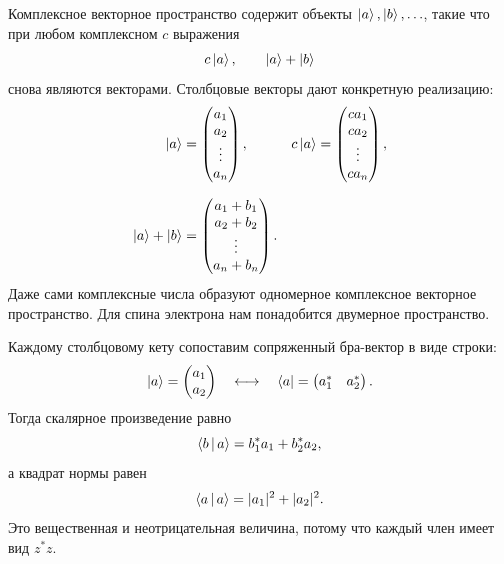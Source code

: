Комплексное векторное пространство содержит объекты \(\left\lvert a\right\rangle,\left\lvert b\right\rangle,\ldots\), такие что при любом комплексном \(c\) выражения
\begin{equation}
  c\left\lvert a\right\rangle,
  \qquad
  \left\lvert a\right\rangle+\left\lvert b\right\rangle
\end{equation}
снова являются векторами. Столбцовые векторы дают конкретную реализацию:
\begin{equation}
  \begin{aligned}
    \left\lvert a\right\rangle&=
    \begin{pmatrix}
      a_1\\a_2\\ \vdots\\a_n
    \end{pmatrix},
    &
    c\left\lvert a\right\rangle&=
    \begin{pmatrix}
      ca_1\\ca_2\\ \vdots\\ca_n
    \end{pmatrix},\\[0.7em]
    \left\lvert a\right\rangle+\left\lvert b\right\rangle&=
    \begin{pmatrix}
      a_1+b_1\\a_2+b_2\\ \vdots\\a_n+b_n
    \end{pmatrix}.
  \end{aligned}
  \label{eq:l02-vector-operations}
\end{equation}
Даже сами комплексные числа образуют одномерное комплексное векторное пространство. Для спина электрона нам понадобится двумерное пространство.

Каждому столбцовому кету сопоставим сопряженный бра-вектор в виде строки:
\begin{equation}
  \left\lvert a\right\rangle=
  \begin{pmatrix}a_1\\a_2\end{pmatrix}
  \quad\longleftrightarrow\quad
  \left\langle a\right\rvert=
  \begin{pmatrix}a_1^*&a_2^*\end{pmatrix}.
  \label{eq:l02-bra-ket-components}
\end{equation}
Тогда скалярное произведение равно
\begin{equation}
  \left\langle b\,\middle|\,a\right\rangle=b_1^*a_1+b_2^*a_2,
  \label{eq:l02-inner-product}
\end{equation}
а квадрат нормы равен
\begin{equation}
  \left\langle a\,\middle|\,a\right\rangle=|a_1|^2+|a_2|^2.
  \label{eq:l02-norm}
\end{equation}
Это вещественная и неотрицательная величина, потому что каждый член имеет вид \(z^*z\).

